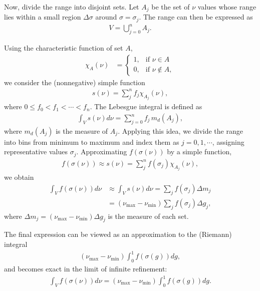 Now, divide the range into disjoint sets.  
Let $A_j$ be the set of $\nu$ values whose range lies within a small region $\Delta \sigma$ around $\sigma = \sigma_j$.  
The range can then be expressed as
\begin{align}
    V = \bigcup_{j=0}^{n} A_j.
\end{align}

Using the characteristic function of set $A$,
\begin{align}
   \chi_A (\nu) &= \begin{cases}
  1, & \text{if } \nu \in A \\
  0, & \text{if } \nu \notin A,
\end{cases}
\end{align}
we consider the (nonnegative) simple function
\begin{align}
    s(\nu) = \sum_j^n f_j \chi_{A_j}(\nu),
\end{align}
where $0 \leq f_0 < f_1 < \cdots < f_n$.  
The Lebesgue integral is defined as
\begin{align}
    \int_V s(\nu) d \nu = \sum_{j=0}^n f_j \, m_d (A_j),
\end{align}
where $m_d(A_j)$ is the measure of $A_j$.  
Applying this idea, we divide the range into bins from minimum to maximum and index them as $j=0,1,\cdots$, assigning representative values $\sigma_j$.  
Approximating $f(\sigma(\nu))$ by a simple function,
\begin{align}
    f(\sigma(\nu)) \approx s(\nu) = \sum_j^n f(\sigma_j) \chi_{A_j}(\nu),
\end{align}
we obtain
\begin{align}
 \int_V f(\sigma(\nu)) d \nu &\approx \int_V s(\nu) d \nu = \sum_j f(\sigma_j) \Delta m_j \\
 &= (\nu_\mathrm{max} - \nu_\mathrm{min}) \sum_j f(\sigma_j) \Delta g_j,
\end{align}
where $\Delta m_j = (\nu_\mathrm{max} - \nu_\mathrm{min}) \Delta g_j$ is the measure of each set.  

The final expression can be viewed as an approximation to the (Riemann) integral
\begin{align}
(\nu_\mathrm{max} - \nu_\mathrm{min}) \int_0^1 f(\sigma(g)) dg,
\end{align}
and becomes exact in the limit of infinite refinement:
\begin{align}
\label{eq:Lebesgue}
\int_V f(\sigma(\nu)) d \nu = (\nu_\mathrm{max} - \nu_\mathrm{min}) \int_0^1 f(\sigma(g)) dg.
\end{align}

